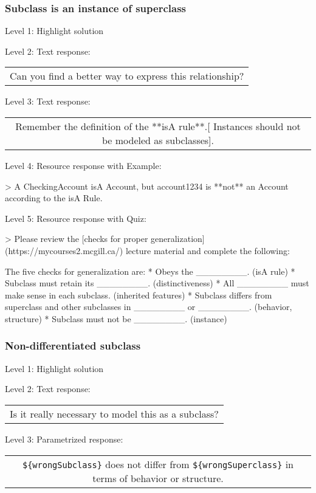 \subsubsection{Subclass is an instance of superclass}

\noindent Level 1: Highlight solution \medskip

\noindent Level 2: Text response: \medskip

\begin{tabular}{|c}
Can you find a better way to express this relationship?
\end{tabular} \medskip

\noindent Level 3: Text response: \medskip

\begin{tabular}{|c}
Remember the definition of the **isA rule**.[ Instances should not be modeled as subclasses].
\end{tabular} \medskip

\noindent Level 4: Resource response with Example:

> A CheckingAccount isA Account, but account1234 is **not** an Account according to the isA Rule.

\noindent Level 5: Resource response with Quiz:

> Please review the [checks for proper generalization](https://mycourses2.mcgill.ca/) lecture material
and complete the following:

The five checks for generalization are:
* Obeys the ________. (isA rule)
* Subclass must retain its ________. (distinctiveness)
* All ________ must make sense in each subclass. (inherited features)
* Subclass differs from superclass and other subclasses in ________ or ________. 
(behavior, structure)
* Subclass must not be ________. (instance)


\subsubsection{Non-differentiated subclass}

\noindent Level 1: Highlight solution \medskip

\noindent Level 2: Text response: \medskip

\begin{tabular}{|c}
Is it really necessary to model this as a subclass?
\end{tabular} \medskip

\noindent Level 3: Parametrized response: \medskip

\begin{tabular}{|c}
\verb|${wrongSubclass}| does not differ from \verb|${wrongSuperclass}| in terms of behavior or structure.
\end{tabular} \medskip

